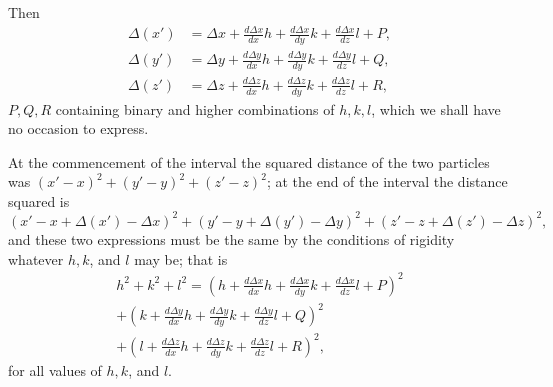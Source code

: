 \documentclass[11pt]{article}
\begin{document}
Then
\begin{align*}
\Delta(x')&=\Delta x+\frac{d\Delta x}{dx}h+\frac{d\Delta x}{dy}k+\frac{d\Delta x}{dz}l+P,\\
\Delta(y')&=\Delta y+\frac{d\Delta y}{dx}h+\frac{d\Delta y}{dy}k+\frac{d\Delta y}{dz}l+Q,\\
\Delta(z')&=\Delta z+\frac{d\Delta z}{dx}h+\frac{d\Delta z}{dy}k+\frac{d\Delta z}{dz}l+R,
\end{align*}
$P,Q,R$ containing binary and higher combinations of $h,k,l$, which we shall have no occasion to express.

At the commencement of the interval the squared distance of the two particles was $(x'-x)^2+(y'-y)^2+(z'-z)^2$; at the end of the interval the distance squared is
\[
(x'-x+\Delta(x')-\Delta x)^2+(y'-y+\Delta(y')-\Delta y)^2+(z'-z+\Delta(z')-\Delta z)^2,
\]
and these two expressions must be the same by the conditions of rigidity whatever $h,k$, and $l$ may be; that is
\begin{multline*}
h^2+k^2+l^2=\left(h+\frac{d\Delta x}{dx}h+\frac{d\Delta x}{dy}k+\frac{d\Delta x}{dz}l+P\right)^2\\
+\left(k+\frac{d\Delta y}{dx}h+\frac{d\Delta y}{dy}k+\frac{d\Delta y}{dz}l+Q\right)^2\\
+\left(l+\frac{d\Delta z}{dx}h+\frac{d\Delta z}{dy}k+\frac{d\Delta z}{dz}l+R\right)^2,
\end{multline*}
for all values of $h,k$, and $l$.
\end{document}
